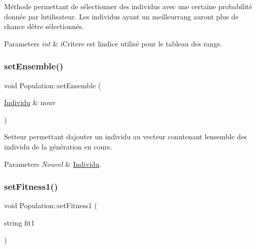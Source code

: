 Méthode permettant de sélectionner des individus avec une certaine probabilité donnée par l\textquotesingle{}utilisateur. Les individus ayant un meilleurrang auront plus de chance d\textquotesingle{}être sélectionnés. 


\begin{DoxyParams}{Parameters}
{\em int} & i\+Critere est l\textquotesingle{}indice utilisé pour le tableau des rangs. \\
\hline
\end{DoxyParams}
\mbox{\label{class_population_a1c15a197054721dfbcdbb4a7882b3e95}} 
\subsubsection{\texorpdfstring{set\+Ensemble()}{setEnsemble()}}
{\footnotesize\ttfamily void Population\+::set\+Ensemble (\begin{DoxyParamCaption}\item[{\hyperlink{class_individu}{Individu} \&}]{nouv }\end{DoxyParamCaption})}



Setteur permettant d\textquotesingle{}ajouter un individu au vecteur conntenant l\textquotesingle{}ensemble des individu de la génération en cours. 


\begin{DoxyParams}{Parameters}
{\em Nouvel} & \hyperlink{class_individu}{Individu}. \\
\hline
\end{DoxyParams}
\mbox{\label{class_population_a7573ba5ab354228ffcb76c7dd43b5205}} 
\subsubsection{\texorpdfstring{set\+Fitness1()}{setFitness1()}}
{\footnotesize\ttfamily void Population\+::set\+Fitness1 (\begin{DoxyParamCaption}\item[{string}]{fit1 }\end{DoxyParamCaption})}



